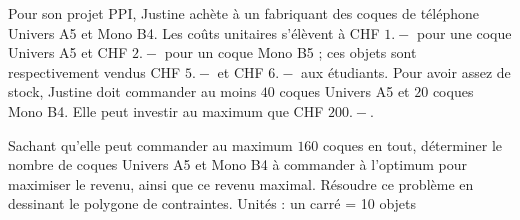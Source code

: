 \documentclass[12pt, addpoints]{exam}
\begin{document}
\begin{questions}
\vspace{5mm}


\newpage

\question 

Pour son projet PPI, Justine achète à un fabriquant des coques de téléphone Univers A5 et Mono B4. Les coûts unitaires s'élèvent à CHF $1.-$ pour une coque Univers A5 et CHF $2.-$ pour un coque Mono B5 ; ces objets sont respectivement vendus CHF $5.-$ et CHF $6.-$ aux étudiants. Pour avoir assez de stock, Justine doit commander au moins $40$ coques Univers A5 et $20$ coques Mono B4. Elle peut investir au maximum que CHF $200.-$.

Sachant qu'elle peut commander au maximum $160$ coques en tout, déterminer le nombre de coques Univers A5 et Mono B4 à commander à l'optimum pour maximiser le revenu, ainsi que ce revenu maximal. 
Résoudre ce problème en dessinant le polygone de contraintes. 
Unités : un carré = 10 objets

\vspace{5mm}


\newpage



\end{questions}
\end{document}
